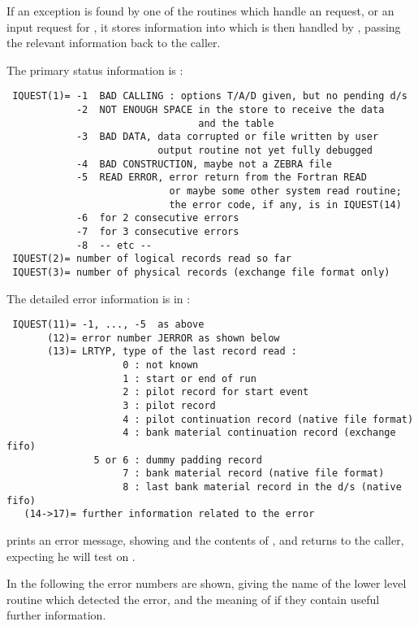 If an exception is found by one of the routines which handle
an  request, or an input request for ,
it stores information into \IQUEST{} which is then handled
by , passing the relevant information back to the caller.

The primary status information is :

\begin{verbatim}
 IQUEST(1)= -1  BAD CALLING : options T/A/D given, but no pending d/s
            -2  NOT ENOUGH SPACE in the store to receive the data
                                 and the table
            -3  BAD DATA, data corrupted or file written by user
                          output routine not yet fully debugged
            -4  BAD CONSTRUCTION, maybe not a ZEBRA file
            -5  READ ERROR, error return from the Fortran READ
                            or maybe some other system read routine;
                            the error code, if any, is in IQUEST(14)
            -6  for 2 consecutive errors
            -7  for 3 consecutive errors
            -8  -- etc --
 IQUEST(2)= number of logical records read so far
 IQUEST(3)= number of physical records (exchange file format only)
\end{verbatim}

The detailed error information is in :

\begin{verbatim}
 IQUEST(11)= -1, ..., -5  as above
       (12)= error number JERROR as shown below
       (13)= LRTYP, type of the last record read :
                    0 : not known
                    1 : start or end of run
                    2 : pilot record for start event
                    3 : pilot record
                    4 : pilot continuation record (native file format)
                    4 : bank material continuation record (exchange fifo)
               5 or 6 : dummy padding record
                    7 : bank material record (native file format)
                    8 : last bank material record in the d/s (native fifo)
   (14->17)= further information related to the error
\end{verbatim}

 prints an error message, showing  
and the contents of \IQUEST,
and returns to the caller, expecting he will test on .

In the following the error numbers  are shown, giving the name
of the lower level routine which detected the error, and the meaning
of  if they contain useful further information.

